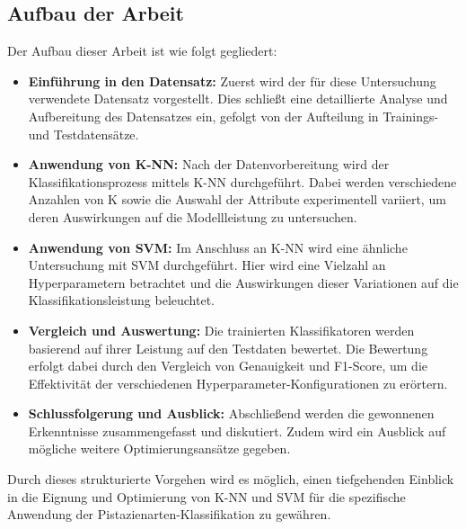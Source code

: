 \subsection*{Aufbau der Arbeit}
Der Aufbau dieser Arbeit ist wie folgt gegliedert:
\begin{itemize}
	\item \textbf{Einführung in den Datensatz:} Zuerst wird der für diese Untersuchung verwendete Datensatz vorgestellt. Dies schließt eine detaillierte Analyse und Aufbereitung des Datensatzes ein, gefolgt von der Aufteilung in Trainings- und Testdatensätze.
	\item \textbf{Anwendung von K-NN:} Nach der Datenvorbereitung wird der Klassifikationsprozess mittels K-NN durchgeführt. Dabei werden verschiedene Anzahlen von \glqq{}K\grqq{} sowie die Auswahl der Attribute experimentell variiert, um deren Auswirkungen auf die Modellleistung zu untersuchen.
	\item \textbf{Anwendung von SVM:} Im Anschluss an K-NN wird eine ähnliche Untersuchung mit SVM durchgeführt. Hier wird eine Vielzahl an Hyperparametern betrachtet und die Auswirkungen dieser Variationen auf die Klassifikationsleistung beleuchtet.
	\item \textbf{Vergleich und Auswertung:} Die trainierten Klassifikatoren werden basierend auf ihrer Leistung auf den Testdaten bewertet. Die Bewertung erfolgt dabei durch den Vergleich von Genauigkeit und F1-Score, um die Effektivität der verschiedenen Hyperparameter-Konfigurationen zu erörtern.
	\item \textbf{Schlussfolgerung und Ausblick:} Abschließend werden die gewonnenen Erkenntnisse zusammengefasst und diskutiert. Zudem wird ein Ausblick auf mögliche weitere Optimierungsansätze gegeben.
\end{itemize}

Durch dieses strukturierte Vorgehen wird es möglich, einen tiefgehenden Einblick in die Eignung und Optimierung von K-NN und SVM für die spezifische Anwendung der Pistazienarten-Klassifikation zu gewähren.

